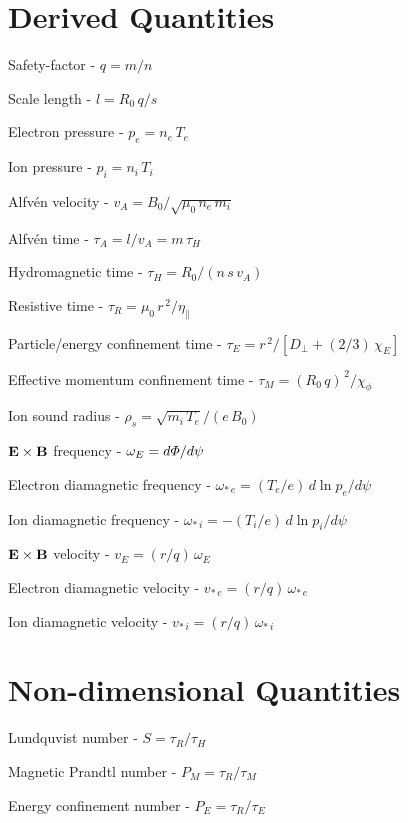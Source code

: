 \documentclass[12pt]{article}
\begin{document}
\section{Derived Quantities}
\begin{description}
\item Safety-factor - $q=m/n$
\item Scale length - $l = R_0\,q/s$ 
\item Electron pressure - $p_e = n_e\,T_e$
\item Ion pressure - $p_i = n_i\,T_i$
\item Alfv\'{e}n velocity - $v_A = B_0/\sqrt{\mu_0\,n_e\,m_i}$
\item Alfv\'{e}n time - $\tau_A= l/v_A =m\,\tau_H$
\item Hydromagnetic time - $\tau_H =R_0/(n\,s\,v_A)$
\item Resistive time - $\tau_R = \mu_0\,r^{\,2}/\eta_\parallel$
\item Particle/energy confinement time - $\tau_E= r^{\,2}/[D_\perp + (2/3)\,\chi_E]$
\item Effective momentum confinement time - $\tau_M = (R_0\,q)^{\,2}/\chi_\phi$
\item Ion sound radius - $\rho_s = \sqrt{m_i\,T_e}/(e\,B_0)$
\item ${\bf E}\times {\bf B}$ frequency - $\omega_E = d{\mit\Phi}/d\psi$
\item Electron diamagnetic frequency - $\omega_{\ast\,e} = (T_e/e)\,d\ln p_e/d\psi$
\item Ion diamagnetic frequency - $\omega_{\ast\,i} =- (T_i/e)\,d\ln p_i/d\psi$
\item ${\bf E}\times {\bf B}$ velocity - $v_E = (r/q)\,\omega_E$
\item Electron diamagnetic velocity -  $v_{\ast\,e} = (r/q)\,\omega_{\ast\,e}$
\item Ion diamagnetic velocity -  $v_{\ast\,i} = (r/q)\,\omega_{\ast\,i}$
\end{description}

\section{Non-dimensional Quantities}
\begin{description}
\item Lundquvist number - $S=\tau_R/\tau_H$
\item Magnetic Prandtl number - $P_M = \tau_R/\tau_M$
\item Energy confinement number - $P_E = \tau_R/\tau_E$
\end{description}
\end{document}
